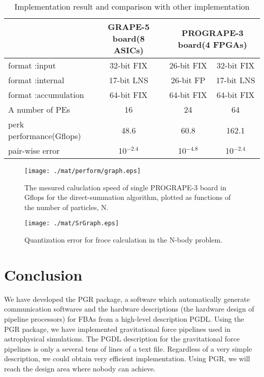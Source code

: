 \documentclass{llncs}
\begin{document}
\begin{table*}
\caption{Implementation result and comparison with other implementation}
\begin{center}
\begin{tabular}{lccc}
\hline
\hline
                     & GRAPE-5 board(8 ASICs) & \multicolumn{2}{c}{PROGRAPE-3 board(4 FPGAs)}  \\
\hline
format :input        & 32-bit FIX          & 26-bit FIX   & 32-bit FIX \\
format :internal     & 17-bit LNS          & 26-bit FP    & 17-bit LNS \\
format :accumulation & 64-bit FIX          & 64-bit FIX   & 64-bit FIX \\
A number of PEs      & 16                  &   24         &   64         \\
perk performance(Gflops)    & 48.6         & 60.8         & 162.1        \\
pair-wise error             & 10$^{-2.4}$   &  10$^{-4.8}$ & 10$^{-2.4}$ \\

\hline
\hline
\end{tabular}
\end{center}
\label{tabcompg5}
\end{table*}

\begin{figure}[htb]
\begin{center}
\texttt{[image: ./mat/perform/graph.eps]}
\caption{The mesured caluclation speed of single PROGRAPE-3 board in Gflops for the direct-summation algorithm, plotted as functions of the number of particles, N.}
\label{MESURE-PERFORM}
\end{center}
\end{figure}

\begin{figure}[htb]
\begin{center}
\texttt{[image: ./mat/SrGraph.eps]}
\caption{Quantization error for froce calculation in the N-body problem.}
\label{SrError}
\end{center}
\end{figure}



\section{Conclusion}
We have developed the PGR package, a software which automatically generate
communication softwares and the hardware descriptions
(the hardware design of pipeline processors)
for FBAs from a high-level description PGDL.
Using the PGR package, we have implemented gravitational force
pipelines used in astrophysical simulations.
The PGDL description for the gravitational force pipelines
is only a several tens of lines of a text file.
Regardless of a very simple description, we could obtain very
efficient implementation. 
Using PGR, we will reach the design area where nobody can achieve.
\end{document}
